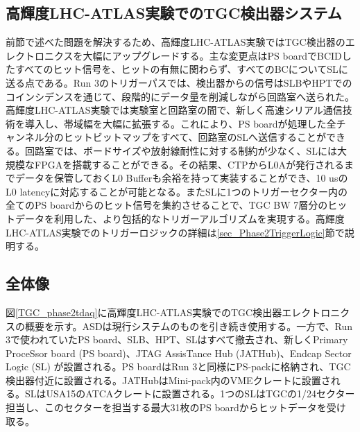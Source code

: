     \subsection{高輝度LHC-ATLAS実験でのTGC検出器システム}  
前節で述べた問題を解決するため、高輝度LHC-ATLAS実験ではTGC検出器のエレクトロニクスを大幅にアップグレードする。主な変更点はPS boardでBCIDしたすべてのヒット信号を、ヒットの有無に関わらず、すべてのBCについてSLに送る点である。Run 3のトリガーパスでは、検出器からの信号はSLBやHPTでのコインシデンスを通じて、段階的にデータ量を削減しながら回路室へ送られた。高輝度LHC-ATLAS実験では実験室と回路室の間で、新しく高速シリアル通信技術を導入し、帯域幅を大幅に拡張する。これにより、PS boardが処理した全チャンネル分のヒットビットマップをすべて、回路室のSLへ送信することができる。回路室では、ボードサイズや放射線耐性に対する制約が少なく、SLには大規模なFPGAを搭載することができる。その結果、CTPからL0Aが発行されるまでデータを保管しておくL0 Bufferも余裕を持って実装することができ、10 usのL0 latencyに対応することが可能となる。またSLに1つのトリガーセクター内の全てのPS boardからのヒット信号を集約させることで、TGC BW 7層分のヒットデータを利用した、より包括的なトリガーアルゴリズムを実現する。高輝度LHC-ATLAS実験でのトリガーロジックの詳細は\ref{sec_Phase2TriggerLogic}節で説明する。

\subsection*{全体像}
図\ref{TGC_phase2tdaq}に高輝度LHC-ATLAS実験でのTGC検出器エレクトロニクスの概要を示す。ASDは現行システムのものを引き続き使用する。一方で、Run 3で使われていたPS board、SLB、HPT、SLはすべて撤去され、新しくPrimary ProceSsor board  (PS board)、JTAG AssisTance Hub  (JATHub)、Endcap Sector Logic  (SL) が設置される。PS boardはRun 3と同様にPS-packに格納され、TGC検出器付近に設置される。JATHubはMini-pack内のVMEクレートに設置される。SLはUSA15のATCAクレートに設置される。1つのSLはTGCの1/24セクター担当し、このセクターを担当する最大31枚のPS boardからヒットデータを受け取る。


